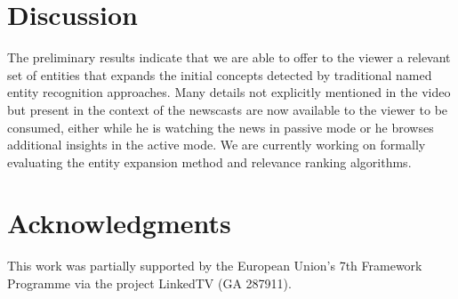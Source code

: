 \documentclass{llncs}
\begin{document}
\section{Discussion}
\label{sec:discussion}
The preliminary results indicate that we are able to offer to the viewer a relevant set of entities that expands the initial concepts detected by traditional named entity recognition approaches. Many details not explicitly mentioned in the video but present in the context of the newscasts are now available to the viewer to be consumed, either while he is watching the news in passive mode or he browses additional insights in the active mode. We are currently working on formally evaluating the entity expansion method and relevance ranking algorithms.




\section*{Acknowledgments}
This work was partially supported by the European Union's 7th Framework Programme via the project LinkedTV (GA 287911).



\end{document}
